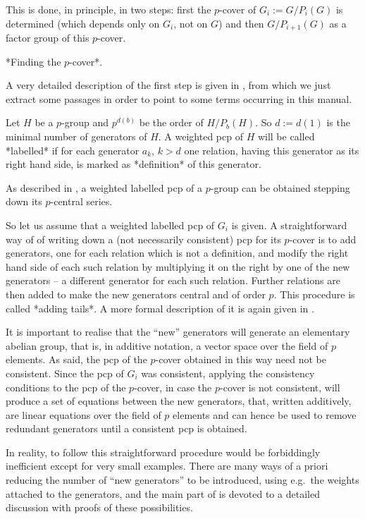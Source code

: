 This  is  done, in  principle,  in  two  steps:  first  the  $p$-cover
of $G_i := G/P_i(G)$ is determined (which depends only on
$G_i$, not on  $G$) and then $G/P_{i+1}(G)$ as a  factor group of this
$p$-cover.

*Finding the $p$-cover*.

A very detailed description of  the first step is given in \cite{NNN98},
from which  we just extract  some passages in  order to point  to some
terms occurring in this manual.

Let $H$ be a $p$-group and $p^{d(b)}$ be the order of  $H/P_b(H)$.  So
$d := d(1)$ is the minimal number of generators of $H$. A weighted pcp
of $H$ will be called *labelled* if for each generator $a_k$, $k >  d$
one relation, having this generator as its right hand side, is  marked
as *definition* of this generator.

As described in \cite{NNN98}, a weighted labelled pcp of  a  $p$-group
can be obtained stepping down its $p$-central series.

So let us assume that a weighted labelled pcp of  $G_i$  is  given.  A
straightforward way of of writing down a (not necessarily  consistent)
pcp for its $p$-cover is to add  generators,  one  for  each  relation
which is not a definition, and modify the right hand side of each such
relation by multiplying it on the right by one of the  new  generators
-- a different generator for each such relation. Further relations are
then added to make the new generators central and of order  $p$.  This
procedure is called *adding tails*. A more formal description of it is
again given in \cite{NNN98}.

It is important to realise that the ``new'' generators  will  generate
an elementary abelian group, that is, in additive notation,  a  vector
space over the field  of  $p$  elements.  As  said,  the  pcp  of  the
$p$-cover obtained in this way need not be consistent. Since  the  pcp
of $G_i$ was consistent, applying the consistency  conditions  to  the
pcp of the $p$-cover, in case the $p$-cover is  not  consistent,  will
produce a set of equations between the new generators,  that,  written
additively, are linear equations over the field of  $p$  elements  and
can hence be used to remove redundant generators  until  a  consistent
pcp is obtained.

In  reality,  to  follow  this  straightforward  procedure  would   be
forbiddingly inefficient except for very  small  examples.  There  are
many ways of a priori reducing the number of ``new generators'' to  be
introduced, using e.g.~the weights attached to the generators, and the
main part of \cite{NNN98} is devoted to  a  detailed  discussion  with
proofs of these possibilities.


